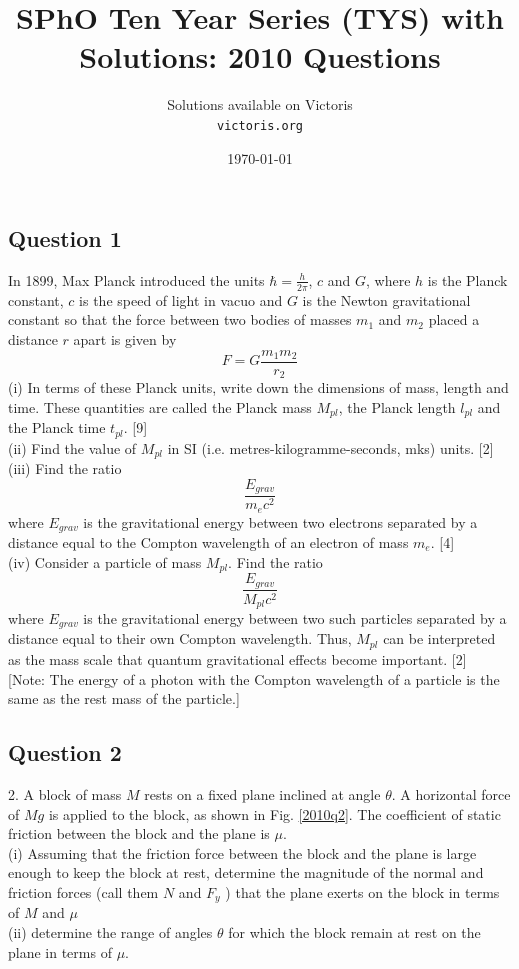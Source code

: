 \documentclass{article}
\title{SPhO Ten Year Series (TYS) with Solutions: 2010 Questions}
\author{
    Solutions available on Victoris\\
    \texttt{victoris.org}
}
\date{\today}
\begin{document}
\maketitle

\subsection{Question 1}
In 1899, Max Planck introduced the units $\hbar=\frac{h}{2\pi}$, $c$ and $G$, where $h$ is the Planck constant, $c$ is the speed of light in vacuo and $G$ is the Newton gravitational constant so that the force between two bodies of masses $m_1$ and $m_2$ placed a distance $r$ apart is given by 
\[F=G\frac{m_1 m_2}{r_2}\]
(i) In terms of these Planck units, write down the dimensions of mass, length and time. These quantities are called the Planck mass $M_{pl}$, the Planck length $l_{pl}$ and the Planck time $t_{pl}$. [9]\\
(ii) Find the value of $M_{pl}$ in SI (i.e. metres-kilogramme-seconds, mks) units. [2] \\
(iii) Find the ratio
 \[\frac{E_{grav}}{m_e c^2}\] where $E_{grav}$ is the gravitational energy between two electrons separated by a distance equal to the Compton wavelength of an electron of mass $m_e$. [4] \\
(iv) Consider a particle of mass $M_{pl}$. Find the ratio \[\frac{E_{grav}}{M_{pl} c^2}\] where $E_{grav}$  is the gravitational energy between two such particles separated by a distance equal to their own Compton wavelength. Thus, $M_{pl}$ can be interpreted as the mass scale that quantum gravitational effects become important. [2] \\

[Note: The energy of a photon with the Compton wavelength of a particle is the same as the rest mass of the particle.] 

\subsection{Question 2}
2. A block of mass $M$ rests on a fixed plane inclined at angle $\theta$. A horizontal force of $Mg$ is applied to the block, as shown in Fig. \ref{2010q2}. The coefficient of static friction between the block and the plane is $\mu$. \\
(i) Assuming that the friction force between the block and the plane is large enough to keep the block at rest, determine the magnitude of the normal and friction forces (call them $N$ and $F_y$ ) that the plane exerts on the block in terms of $M$ and $\mu$\\
(ii) determine the range of angles $\theta$ for which the block remain at rest on the plane in terms of $\mu$. 
\end{document}
